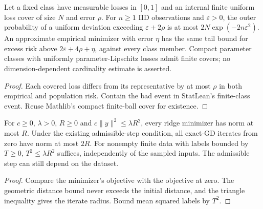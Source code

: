 \begin{lemma}\label{lem:loss_cover}
\leanok
{}
Let a fixed class have measurable losses in $[0,1]$ and an internal finite
uniform loss cover of size $N$ and error $\rho$. For $n\geq1$ IID observations
and $\varepsilon>0$, the outer probability of a uniform deviation exceeding
$\varepsilon+2\rho$ is at most $2N\exp(-2n\varepsilon^2)$.
An approximate empirical minimizer with error $\eta$ has the same tail bound
for excess risk above $2\varepsilon+4\rho+\eta$, against every class member.
Compact parameter classes with uniformly parameter-Lipschitz losses admit
finite covers; no dimension-dependent cardinality estimate is asserted.
\end{lemma}
\begin{proof}
\leanok
Each covered loss differs from its representative by at most $\rho$ in both
empirical and population risk. Contain the bad event in StatLean's finite-class
event. Reuse Mathlib's compact finite-ball cover for existence.
\end{proof}

\begin{lemma}\label{lem:ridge_radius}
\leanok
{}
For $c\geq0$, $\lambda>0$, $R\geq0$ and
$c\|y\|^2\leq\lambda R^2$, every ridge minimizer has norm at most $R$.
Under the existing admissible-step condition, all exact-GD iterates from zero
have norm at most $2R$. For nonempty finite data with labels bounded by $T\geq0$,
$T^2\leq\lambda R^2$ suffices, independently of the sampled inputs.
The admissible step can still depend on the dataset.
\end{lemma}
\begin{proof}
\leanok
Compare the minimizer's objective with the objective at zero. The geometric
distance bound never exceeds the initial distance, and the triangle inequality
gives the iterate radius. Bound mean squared labels by $T^2$.
\end{proof}

